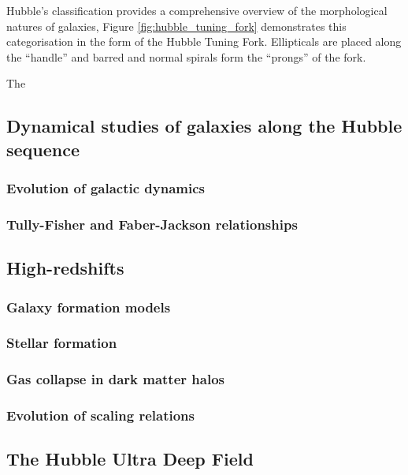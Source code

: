 \documentclass[12pt, twocolumn]{revtex4}    %
\begin{document}
Hubble's classification provides a comprehensive overview of the morphological natures of galaxies, Figure \ref{fig:hubble_tuning_fork} demonstrates this categorisation in the form of the Hubble Tuning Fork. Ellipticals are placed along the ``handle'' and barred and normal spirals form the ``prongs'' of the fork. 

The 

\subsection{Dynamical studies of galaxies along the Hubble sequence}

\subsubsection{Evolution of galactic dynamics}

\subsubsection{Tully-Fisher and Faber-Jackson relationships}

\subsection{High-redshifts}

\subsubsection{Galaxy formation models}

\subsubsection{Stellar formation}

\subsubsection{Gas collapse in dark matter halos}

\subsubsection{Evolution of scaling relations}

\subsection{The Hubble Ultra Deep Field}
\end{document}

